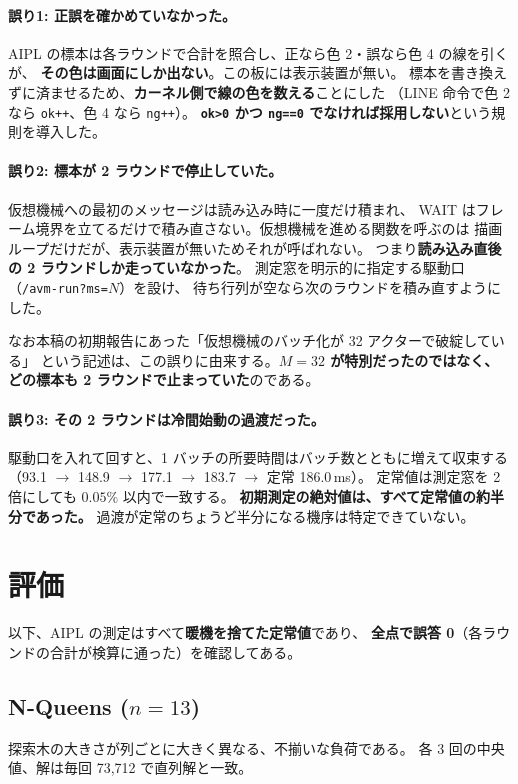 \documentclass[a4paper,11pt]{ltjsarticle}
\begin{document}
\paragraph{誤り1: 正誤を確かめていなかった。}
AIPL の標本は各ラウンドで合計を照合し、正なら色 2・誤なら色 4 の線を引くが、
\textbf{その色は画面にしか出ない}。この板には表示装置が無い。
標本を書き換えずに済ませるため、\textbf{カーネル側で線の色を数える}ことにした
（LINE 命令で色 2 なら \texttt{ok++}、色 4 なら \texttt{ng++}）。
\textbf{\texttt{ok>0} かつ \texttt{ng==0} でなければ採用しない}という規則を導入した。

\paragraph{誤り2: 標本が 2 ラウンドで停止していた。}
仮想機械への最初のメッセージは読み込み時に一度だけ積まれ、
WAIT はフレーム境界を立てるだけで積み直さない。仮想機械を進める関数を呼ぶのは
描画ループだけだが、表示装置が無いためそれが呼ばれない。
つまり\textbf{読み込み直後の 2 ラウンドしか走っていなかった}。
測定窓を明示的に指定する駆動口（\texttt{/avm-run?ms=$N$}）を設け、
待ち行列が空なら次のラウンドを積み直すようにした。

なお本稿の初期報告にあった「仮想機械のバッチ化が 32 アクターで破綻している」
という記述は、この誤りに由来する。\textbf{$M=32$ が特別だったのではなく、
どの標本も 2 ラウンドで止まっていた}のである。

\paragraph{誤り3: その 2 ラウンドは冷間始動の過渡だった。}
駆動口を入れて回すと、1 バッチの所要時間はバッチ数とともに増えて収束する
（93.1 $\to$ 148.9 $\to$ 177.1 $\to$ 183.7 $\to$ 定常 186.0\,ms）。
定常値は測定窓を 2 倍にしても $0.05\%$ 以内で一致する。
\textbf{初期測定の絶対値は、すべて定常値の約半分であった。}
過渡が定常のちょうど半分になる機序は特定できていない。

\section{評価}\label{sec:eval}

以下、AIPL の測定はすべて\textbf{暖機を捨てた定常値}であり、
\textbf{全点で誤答 0}（各ラウンドの合計が検算に通った）を確認してある。

\subsection{N-Queens ($n=13$)}
探索木の大きさが列ごとに大きく異なる、不揃いな負荷である。
各 3 回の中央値、解は毎回 73{,}712 で直列解と一致。
\end{document}
